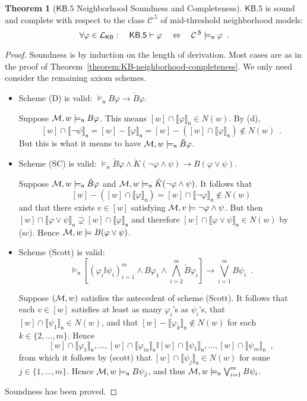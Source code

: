\documentclass[12pt]{article}
\theoremstyle{definition}
\newtheorem{theorem}{Theorem}[section]
\newcommand{\M}{{\cal M}}      %
\newcommand{\Lang}{{\cal L}}   %
\newcommand{\KB}{{\mathsf{KB}}}                 %
\newcommand{\KBeq}{{\mathsf{KB.5}}}             %
\newcommand{\Ceq}{{\mathcal{C}^{\mathsf{.5}}}}  %
\newcommand{\modelsn}{\models_{\mathsf{n}}}                  %
\newcommand{\semn}[1]{\llbracket{#1}\rrbracket_{\mathsf{n}}} %
\begin{document}
\begin{theorem}[$\KBeq$ Neighborhood Soundness and Completeness]
  \label{theorem:KBeq}
  $\KBeq$ is sound and complete with respect to the class $\Ceq$ of
  mid-threshold neighborhood models:
  \[
  \forall\varphi\in\Lang_\KB:\quad
  \KBeq\vdash\varphi \quad\Leftrightarrow\quad \Ceq\modelsn\varphi \enspace.
  \]
\end{theorem}
\begin{proof}
  Soundness is by induction on the length of derivation.  Most cases
  are as in the proof of
  Theorem~\ref{theorem:KB-neighborhood-completeness}.  We only need
  consider the remaining axiom schemes.
  \begin{itemize}
  \item Scheme (D) is valid: $\modelsn B\varphi\to \check B\varphi$.

    Suppose $\M,w\modelsn B\varphi$. This means
    $[w]\cap\semn\varphi\in N(w)$.  By (d), 
    \[
    [w]\cap\semn{\lnot\psi}=[w]-\semn\varphi =
    [w]-([w]\cap\semn\varphi)\notin N(w)\enspace.
    \]
    But this is what it means to have $\M,w\modelsn\check B\varphi$.

  \item Scheme (SC) is valid: $\modelsn \check B\varphi \land \check
    K(\lnot\varphi\land\psi) \to B(\varphi\lor\psi)$.

    Suppose $\M,w\modelsn\check B\varphi$ and $\M,w\modelsn \check
    K(\lnot\varphi\land\psi)$.  It follows that
    \[
    [w]-([w]\cap\semn{\varphi})=[w]\cap\semn{\lnot\varphi}\notin
    N(w)
    \]
    and that there exists $v\in[w]$ satisfying
    $\M,v\models\lnot\varphi\land\psi$.  But then
    $[w]\cap\semn{\varphi\lor\psi}\supsetneq[w]\cap\semn{\varphi}$ and
    therefore $[w]\cap\semn{\varphi\lor\psi}\in N(w)$ by (sc). Hence
    $\M,w\models B(\varphi\lor\psi)$.

  \item Scheme (Scott) is valid:
    \[
    \modelsn \textstyle [(\varphi_i\mathbb{I}\psi_i)_{i=1}^m
    \land B\varphi_1 \land \bigwedge_{i=2}^m \check B\varphi_i] \to
    \bigvee_{i=1}^m B\psi_i\enspace.
    \]

    Suppose $(\M,w)$ satisfies the antecedent of scheme (Scott).  It
    follows that each $v\in[w]$ satisfies at least as many
    $\varphi_i$'s as $\psi_i$'s, that $[w]\cap\semn{\psi_1}\in N(w)$,
    and that $[w]-\semn{\varphi_k}\notin N(w)$ for each
    $k\in\{2,\dots,m\}$.  Hence
    \[
    [w]\cap\semn{\varphi_1},\dots,[w]\cap\semn{\varphi_m}\mathbb{I}
    [w]\cap\semn{\psi_1},\dots, [w]\cap\semn{\psi_m}\enspace,
    \]
    from which it follows by (scott) that $[w]\cap\semn{\psi_j}\in
    N(w)$ for some $j\in\{1,\dots,m\}$.  Hence $\M,w\modelsn
    B\psi_j$, and thus $\M,w\modelsn\bigvee_{i=1}^m B\psi_i$.
  \end{itemize}
  Soundness has been proved.  


\end{proof}
\end{document}
